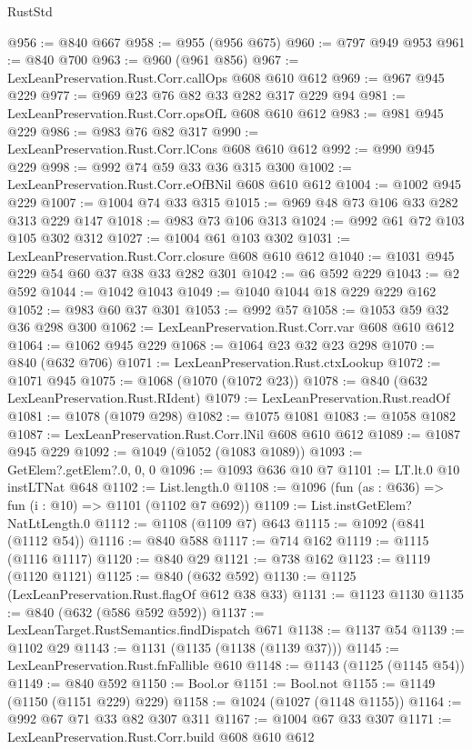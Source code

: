 \begin{lexlean}{RustStd}
\begin{coremodule}
{\begin{coremodule}
{{{{{{{{{{@956 := @840 @667
@958 := @955 (@956 @675)
@960 := @797 @949 @953
@961 := @840 @700
@963 := @960 (@961 @856)
@967 := LexLeanPreservation.Rust.Corr.callOps @608 @610 @612
@969 := @967 @945 @229
@977 := @969 @23 @76 @82 @33 @282 @317 @229 @94
@981 := LexLeanPreservation.Rust.Corr.opsOfL @608 @610 @612
@983 := @981 @945 @229
@986 := @983 @76 @82 @317
@990 := LexLeanPreservation.Rust.Corr.lCons @608 @610 @612
@992 := @990 @945 @229
@998 := @992 @74 @59 @33 @36 @315 @300
@1002 := LexLeanPreservation.Rust.Corr.eOfBNil @608 @610 @612
@1004 := @1002 @945 @229
@1007 := @1004 @74 @33 @315
@1015 := @969 @48 @73 @106 @33 @282 @313 @229 @147
@1018 := @983 @73 @106 @313
@1024 := @992 @61 @72 @103 @105 @302 @312
@1027 := @1004 @61 @103 @302
@1031 := LexLeanPreservation.Rust.Corr.closure @608 @610 @612
@1040 := @1031 @945 @229 @54 @60 @37 @38 @33 @282 @301
@1042 := @6 @592 @229
@1043 := @2 @592
@1044 := @1042 @1043
@1049 := @1040 @1044 @18 @229 @229 @162
@1052 := @983 @60 @37 @301
@1053 := @992 @57
@1058 := @1053 @59 @32 @36 @298 @300
@1062 := LexLeanPreservation.Rust.Corr.var @608 @610 @612
@1064 := @1062 @945 @229
@1068 := @1064 @23 @32 @23 @298
@1070 := @840 (@632 @706)
@1071 := LexLeanPreservation.Rust.ctxLookup
@1072 := @1071 @945
@1075 := @1068 (@1070 (@1072 @23))
@1078 := @840 (@632 LexLeanPreservation.Rust.RIdent)
@1079 := LexLeanPreservation.Rust.readOf
@1081 := @1078 (@1079 @298)
@1082 := @1075 @1081
@1083 := @1058 @1082
@1087 := LexLeanPreservation.Rust.Corr.lNil @608 @610 @612
@1089 := @1087 @945 @229
@1092 := @1049 (@1052 (@1083 @1089))
@1093 := GetElem?.getElem?.{0, 0, 0}
@1096 := @1093 @636 @10 @7
@1101 := LT.lt.{0} @10 instLTNat @648
@1102 := List.length.{0}
@1108 := @1096 (fun (as : @636) => fun (i : @10) => @1101 (@1102 @7 @692))
@1109 := List.instGetElem?NatLtLength.{0}
@1112 := @1108 (@1109 @7) @643
@1115 := @1092 (@841 (@1112 @54))
@1116 := @840 @588
@1117 := @714 @162
@1119 := @1115 (@1116 @1117)
@1120 := @840 @29
@1121 := @738 @162
@1123 := @1119 (@1120 @1121)
@1125 := @840 (@632 @592)
@1130 := @1125 (LexLeanPreservation.Rust.flagOf @612 @38 @33)
@1131 := @1123 @1130
@1135 := @840 (@632 (@586 @592 @592))
@1137 := LexLeanTarget.RustSemantics.findDispatch @671
@1138 := @1137 @54
@1139 := @1102 @29
@1143 := @1131 (@1135 (@1138 (@1139 @37)))
@1145 := LexLeanPreservation.Rust.fnFallible @610
@1148 := @1143 (@1125 (@1145 @54))
@1149 := @840 @592
@1150 := Bool.or
@1151 := Bool.not
@1155 := @1149 (@1150 (@1151 @229) @229)
@1158 := @1024 (@1027 (@1148 @1155))
@1164 := @992 @67 @71 @33 @82 @307 @311
@1167 := @1004 @67 @33 @307
@1171 := LexLeanPreservation.Rust.Corr.build @608 @610 @612
}}}}}}}}}}
\end{coremodule}}
\end{coremodule}
\end{lexlean}

